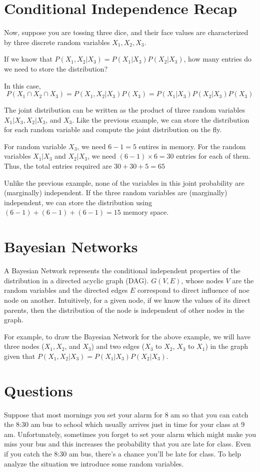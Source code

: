 \documentclass[11pt]{article}
\begin{document}
\section{Conditional Independence Recap}
Now, suppose you are tossing three dice, and their face values are characterized by three discrete random variables $X_1, X_2, X_3$.

If we know that $P(X_1, X_2 | X_3) = P(X_1 | X_3) P(X_2 | X_3)$, how many entries do we need to store the distribution?

In this case,
$$P(X_1 \cap X_2 \cap X_3) = P(X_1, X_2 | X_3) P(X_3) = P(X_1 | X_3) P(X_2 | X_3) P(X_3)$$

The joint distribution can be written as the product of three random variables $X_1 | X_3,  X_2 | X_3$, and $ X_3$.
Like the previous example, we can store the distribution for each random variable and compute the joint distribution on the fly.

For random variable $X_3$, we need $6-1 = 5$ entires in memory.
For the random variables $X_1 | X_3$ and $X_2 | X_3$, we need $(6-1) \times 6 = 30$ entries for each of them.
Thus, the total entries required are $30 + 30 + 5 = 65$

Unlike the previous example, none of the variables in this joint probability are (marginally) independent.
If the three random variables are (marginally) independent, we can store the distribution using $(6-1) + (6-1) + (6-1) = 15$ memory space.

\section{Bayesian Networks}
A Bayesian Network represents the conditional independent properties of the distribution in a directed acyclic graph (DAG).
$G(V, E)$, whose nodes $V$ are the random variables and the directed edges $E$ correspond to direct influence of noe node on another.
Intuitively, for a given node, if we know the values of its direct parents, then the distribution of the node is independent of other nodes in the graph.

For example, to draw the Bayesian Network for the above example,
we will have three nodes ($X_1, X_2$, and $X_3$)
and two edges ($X_3$ to $X_2$, $X_3$ to $X_1$) 
in the graph given that $P(X_1, X_2 | X_3) = P(X_1 | X_3) P(X_2 | X_3)$.

\section{Questions}
Suppose that most mornings you set your alarm for 8 am so that you can catch the 8:30 am bus to school which usually arrives just in time for your class at 9 am. 
Unfortunately, sometimes you forget to set your alarm which might make you miss your bus and this increases the probability that you are late for class. 
Even if you catch the 8:30 am bus, there’s a chance you’ll be late for class. To help analyze the situation we introduce some random variables. 
\end{document}
